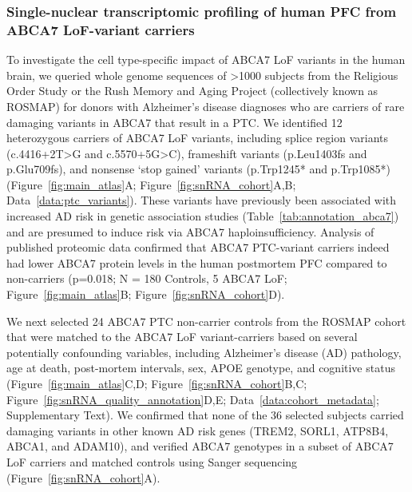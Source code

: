 \subsubsection{Single-nuclear transcriptomic profiling of human PFC from ABCA7 LoF-variant carriers} 
To investigate the cell type-specific impact of ABCA7 LoF variants in the human brain, we queried whole genome sequences of >1000 subjects from the Religious Order Study or the Rush Memory and Aging Project (collectively known as ROSMAP) for donors with Alzheimer’s disease diagnoses who are carriers of rare damaging variants in ABCA7 that result in a PTC. We identified 12 heterozygous carriers of ABCA7 LoF variants, including splice region variants (c.4416+2T>G and c.5570+5G>C), frameshift variants (p.Leu1403fs and p.Glu709fs), and nonsense ‘stop gained’ variants (p.Trp1245* and p.Trp1085*) (Figure~\ref{fig:main_atlas}A; Figure~\ref{fig:snRNA_cohort}A,B; Data~\ref{data:ptc_variants}). These variants have previously been associated with increased AD risk in genetic association studies (Table~\ref{tab:annotation_abca7})\cite{Steinberg2015-mu,Holstege2022-vp} and are presumed to induce risk via ABCA7 haploinsufficiency\cite{Duchateau2024-rf}. Analysis of published proteomic data\cite{Johnson2020-ip} confirmed that ABCA7 PTC-variant carriers indeed had lower ABCA7 protein levels in the human postmortem PFC compared to non-carriers (p=0.018; N = 180 Controls, 5 ABCA7 LoF; Figure~\ref{fig:main_atlas}B; Figure~\ref{fig:snRNA_cohort}D). 

We next selected 24 ABCA7 PTC non-carrier controls from the ROSMAP cohort that were matched to the ABCA7 LoF variant-carriers based on several potentially confounding variables, including Alzheimer's disease (AD) pathology, age at death, post-mortem intervals, sex, APOE genotype, and cognitive status (Figure~\ref{fig:main_atlas}C,D; Figure~\ref{fig:snRNA_cohort}B,C; Figure~\ref{fig:snRNA_quality_annotation}D,E; Data~\ref{data:cohort_metadata}; Supplementary Text). We confirmed that none of the 36 selected subjects carried damaging variants in other known AD risk genes (TREM2, SORL1, ATP8B4, ABCA1, and ADAM10)\cite{Holstege2022-vp}, and verified ABCA7 genotypes in a subset of ABCA7 LoF carriers and matched controls using Sanger sequencing (Figure~\ref{fig:snRNA_cohort}A).

